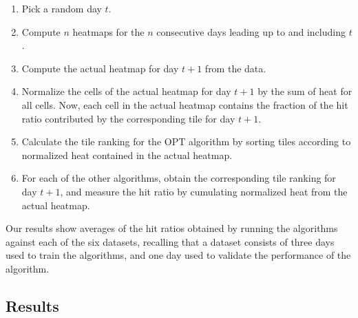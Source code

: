 \documentclass[11pt, oneside]{report}
\begin{document}
\begin{enumerate}
\item Pick a random day $t$.
\item Compute $n$ heatmaps for the $n$ consecutive days leading up to and including $t$.
\item Compute the actual heatmap for day $t+1$ from the data. 
\item Normalize the cells of the actual heatmap for day $t+1$ by the sum of heat for all cells. Now, each cell in the actual heatmap contains the fraction of the hit ratio contributed by the corresponding tile for day $t+1$. 
\item Calculate the tile ranking for the OPT algorithm by sorting tiles according to normalized heat contained in the actual heatmap.
\item For each of the other algorithms, obtain the corresponding tile ranking for day $t+1$, and measure the hit ratio by cumulating normalized heat from the actual heatmap.    
\end{enumerate}


Our results show averages of the hit ratios obtained by running the algorithms against each of the six datasets, recalling that a dataset consists of three days used to train the algorithms, and one day used to validate the performance of the algorithm.

\subsection{Results}
\label{sec:results}
\end{document}
